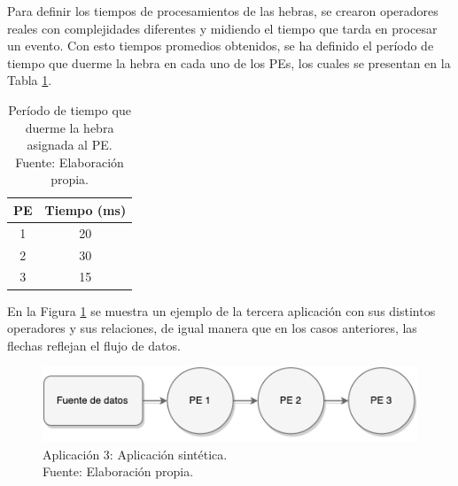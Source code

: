 
Para definir los tiempos de procesamientos de las hebras, se crearon operadores reales con complejidades diferentes y midiendo el tiempo que tarda en procesar un evento. Con esto tiempos promedios obtenidos, se ha definido el período de tiempo que duerme la hebra en cada uno de los PEs, los cuales se presentan en la Tabla \ref{tab:app3-time}.


\begin{table}[!ht]
\centering
\captionsetup{justification=centering}
\caption[Período de tiempo que duerme la hebra asignada al PE.]{Período de tiempo que duerme la hebra asignada al PE.\\Fuente: Elaboración propia.}
\begin{tabular}{| c | c |}
\hline
PE & Tiempo (ms) \\ \hline
1 & 20 \\
2 & 30 \\
3 & 15 \\\hline
\end{tabular}
\label{tab:app3-time}
\end{table}

En la Figura \ref{fig:terceraAplicacion} se muestra un ejemplo de la tercera aplicación con sus distintos operadores y sus relaciones, de igual manera que en los casos anteriores, las flechas reflejan el flujo de datos.

\begin{figure}[!ht]
	\centering
	\captionsetup{justification=centering}
		\includegraphics[scale=0.6]{images/App3.pdf}
	\caption[Aplicación 3: Aplicación sintética.]{Aplicación 3: Aplicación sintética.\\Fuente: Elaboración propia.}
	\label{fig:terceraAplicacion}
\end{figure}

